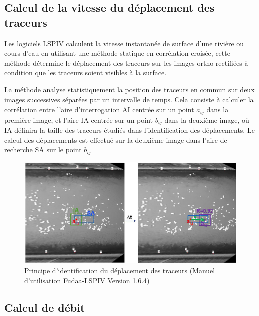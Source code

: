 \documentclass[
]{article}
\begin{document}
\hypertarget{calcul-de-la-vitesse-du-duxe9placement-des-traceurs}{%
\subsection{Calcul de la vitesse du déplacement des traceurs}\label{calcul-de-la-vitesse-du-duxe9placement-des-traceurs}}

Les logiciels LSPIV calculent la vitesse instantanée de surface d'une rivière ou cours d'eau en utilisant une méthode statique en corrélation croisée, cette méthode détermine le déplacement des traceurs sur les images ortho rectifiées à condition que les traceurs soient visibles à la surface.

La méthode analyse statistiquement la position des traceurs en commun sur deux images successives séparées par un intervalle de temps. Cela consiste à calculer la corrélation entre l'aire d'interrogation \(\text{AI}\) centrée sur un point \(a_{ij}\) dans la première image, et l'aire \(\text{IA}\) centrée sur un point \(b_{ij}\) dans la deuxième image, où \(\text{IA}\) définira la taille des traceurs étudiés dans l'identification des déplacements. Le calcul des déplacements est effectué sur la deuxième image dans l'aire de recherche \(\text{SA}\) sur le point \(b_{ij}\)



\begin{figure}
\includegraphics[width=1\linewidth]{images/calculationdevitesse} \caption{Principe d'identification du déplacement des traceurs (Manuel d'utilisation Fudaa-LSPIV Version 1.6.4)}\label{fig:unnamed-chunk-4}
\end{figure}

\hypertarget{calcul-de-duxe9bit}{%
\subsection{Calcul de débit}\label{calcul-de-duxe9bit}}
\end{document}
